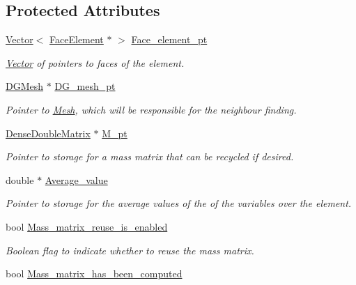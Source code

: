 \subsection*{Protected Attributes}
\begin{DoxyCompactItemize}
\item 
\hyperlink{classoomph_1_1Vector}{Vector}$<$ \hyperlink{classoomph_1_1FaceElement}{Face\+Element} $\ast$ $>$ \hyperlink{classoomph_1_1DGElement_a752becbf28b323514a6e2426c5e07799}{Face\+\_\+element\+\_\+pt}
\begin{DoxyCompactList}\small\item\em \hyperlink{classoomph_1_1Vector}{Vector} of pointers to faces of the element. \end{DoxyCompactList}\item 
\hyperlink{classoomph_1_1DGMesh}{D\+G\+Mesh} $\ast$ \hyperlink{classoomph_1_1DGElement_a247d118e3d474c7b56b8e93db1d5256d}{D\+G\+\_\+mesh\+\_\+pt}
\begin{DoxyCompactList}\small\item\em Pointer to \hyperlink{classoomph_1_1Mesh}{Mesh}, which will be responsible for the neighbour finding. \end{DoxyCompactList}\item 
\hyperlink{classoomph_1_1DenseDoubleMatrix}{Dense\+Double\+Matrix} $\ast$ \hyperlink{classoomph_1_1DGElement_aeeab3c1e5bf7461ef4eaa06638cf48a4}{M\+\_\+pt}
\begin{DoxyCompactList}\small\item\em Pointer to storage for a mass matrix that can be recycled if desired. \end{DoxyCompactList}\item 
double $\ast$ \hyperlink{classoomph_1_1DGElement_a63897eb72ffa8de1e8dbb48047aaef56}{Average\+\_\+value}
\begin{DoxyCompactList}\small\item\em Pointer to storage for the average values of the of the variables over the element. \end{DoxyCompactList}\item 
bool \hyperlink{classoomph_1_1DGElement_ab2078ea04b7bc4d615498f3b6bff13dd}{Mass\+\_\+matrix\+\_\+reuse\+\_\+is\+\_\+enabled}
\begin{DoxyCompactList}\small\item\em Boolean flag to indicate whether to reuse the mass matrix. \end{DoxyCompactList}\item 
bool \hyperlink{classoomph_1_1DGElement_a915c6ac76c58c45393de8e9678e5dfc4}{Mass\+\_\+matrix\+\_\+has\+\_\+been\+\_\+computed}

\end{DoxyCompactItemize}
